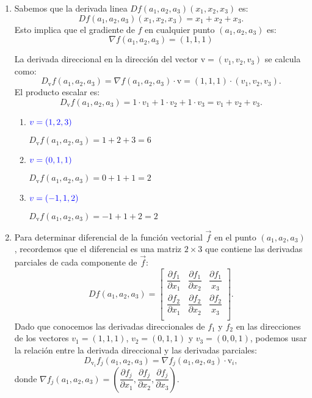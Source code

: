\begin{enumerate}[label=\c olor{red}\textbf{\arabic*)}, leftmargin=*]
\item {}

Sabemos que la derivada linea $Df(a_1,a_2,a_3)(x_1,x_2,x_3)$ es: \[ Df(a_{1},a_{2},a_{3})(x_1,x_2,x_3)=x_1+x_2+x_3. \]Esto implica que el gradiente de $f$ en cualquier punto $(a_1,a_2,a_3)$ es: \[ \nabla f(a_1,a_2,a_3)=(1,1,1) \]

La derivada direccional en la dirección del vector $\mathrm{v}=(v_1,v_2,v_3)$ se calcula como: \[ D_{\mathrm{v}}f(a_1,a_2,a_3)=\nabla f(a_1,a_2,a_3)\cdot\mathrm{v}=(1,1,1)\cdot(v_1,v_2,v_3). \]El producto escalar es: \[D_{\mathrm{v}}f(a_1,a_2,a_3)=1\cdot v_1+1\cdot v_2+1\cdot v_3=v_1+v_2+v_3.  \]
\begin{enumerate}[label=\color{red}\textbf{\alph*)}]
	\item $\textcolor{blue}{v=(1,2,3)}$
	
	$D_{\mathrm{v}}f(a_1,a_2,a_3)=1+2+3=6$
	
	\item $\textcolor{blue}{v=(0,1,1)}$
	
	$D_{\mathrm{v}}f(a_1,a_2,a_3)=0+1+1=2$
	
	\item $\textcolor{blue}{v=(-1,1,2)}$
	
	$D_{\mathrm{v}}f(a_{1},a_2,a_3)=-1+1+2=2$
\end{enumerate}

\item {}

Para determinar diferencial de la función vectorial $\vec{f}$ en el punto $(a_1,a_2,a_3)$, recordemos que el diferencial es una matriz $2\times 3$ que contiene las derivadas parciales de cada componente de $\vec{f}$: \[ Df(a_1,a_2,a_3)=\begin{bmatrix}
\dfrac{\partial f_1}{\partial x_1} & \dfrac{\partial f_1}{\partial x_2} & \dfrac{\partial f_1}{x_3}\\
\dfrac{\partial f_2}{\partial x_1} & \dfrac{\partial f_2}{\partial x_2} & \dfrac{\partial f_2}{x_3}\\
\end{bmatrix}. \]
Dado que conocemos las derivadas direccionales de $f_1$ y $f_2$ en las direcciones de los vectores $v_1=(1,1,1)$, $v_2=(0,1,1)$ y $v_3=(0,0,1)$, podemos usar la relación entre la derivada direccional y las derivadas parciales: \[ D_{\mathrm{v}_i}f_j(a_1,a_2,a_3)=\nabla f_j(a_1,a_2,a_3)\cdot \mathrm{v}_i, \]donde $\nabla f_j(a_1,a_2,a_3)=\left(\dfrac{\partial f_j}{\partial x_1},\dfrac{\partial f_j}{\partial x_2},\dfrac{\partial f_j}{\partial x_3}\right)$.


\end{enumerate}

